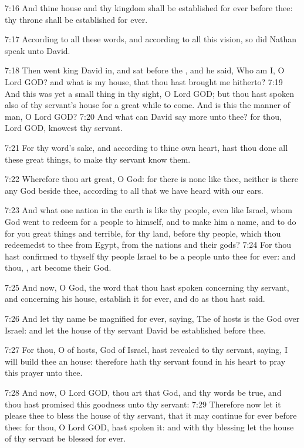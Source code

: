 7:16 And thine house and thy kingdom shall be established for ever
before thee: thy throne shall be established for ever.

7:17 According to all these words, and according to all this vision,
so did Nathan speak unto David.

7:18 Then went king David in, and sat before the \LORD, and he said,
Who am I, O Lord GOD? and what is my house, that thou hast brought me
hitherto?  7:19 And this was yet a small thing in thy sight, O Lord
GOD; but thou hast spoken also of thy servant's house for a great
while to come. And is this the manner of man, O Lord GOD?  7:20 And
what can David say more unto thee? for thou, Lord GOD, knowest thy
servant.

7:21 For thy word's sake, and according to thine own heart, hast thou
done all these great things, to make thy servant know them.

7:22 Wherefore thou art great, O \LORD God: for there is none like
thee, neither is there any God beside thee, according to all that we
have heard with our ears.

7:23 And what one nation in the earth is like thy people, even like
Israel, whom God went to redeem for a people to himself, and to make
him a name, and to do for you great things and terrible, for thy land,
before thy people, which thou redeemedst to thee from Egypt, from the
nations and their gods?  7:24 For thou hast confirmed to thyself thy
people Israel to be a people unto thee for ever: and thou, \LORD, art
become their God.

7:25 And now, O \LORD God, the word that thou hast spoken concerning
thy servant, and concerning his house, establish it for ever, and do
as thou hast said.

7:26 And let thy name be magnified for ever, saying, The \LORD of hosts
is the God over Israel: and let the house of thy servant David be
established before thee.

7:27 For thou, O \LORD of hosts, God of Israel, hast revealed to thy
servant, saying, I will build thee an house: therefore hath thy
servant found in his heart to pray this prayer unto thee.

7:28 And now, O Lord GOD, thou art that God, and thy words be true,
and thou hast promised this goodness unto thy servant: 7:29 Therefore
now let it please thee to bless the house of thy servant, that it may
continue for ever before thee: for thou, O Lord GOD, hast spoken it:
and with thy blessing let the house of thy servant be blessed for
ever.

